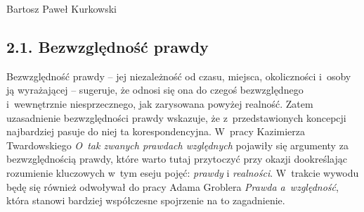 \begin{artplenv}{Bartosz Paweł Kurkowski}
\subsection{2.1. Bezwzględność prawdy}

Bezwzględność prawdy -- jej niezależność od czasu, miejsca, okoliczności i~osoby ją wyrażającej -- sugeruje, że odnosi się
ona do czegoś bezwzględnego i~wewnętrznie niesprzecznego, jak zarysowana powyżej realność. Zatem uzasadnienie
bezwzględności prawdy wskazuje, że z~przedstawionych koncepcji najbardziej pasuje do niej ta korespondencyjna. W~pracy
Kazimierza Twardowskiego
\parencite*{twardowski_o_1900}
\textit{O~tak zwanych prawdach względnych} pojawiły się argumenty za
bezwzględnością prawdy, które warto tutaj przytoczyć przy okazji dookreślając rozumienie kluczowych w~tym eseju pojęć:
\textit{prawdy }i \textit{realności}. W~trakcie wywodu będę się również odwoływał do pracy Adama Groblera 
\parencite*{grobler_prawda_2000}
\textit{Prawda a~względność}, która stanowi bardziej współczesne spojrzenie na to
zagadnienie.



\end{artplenv}
